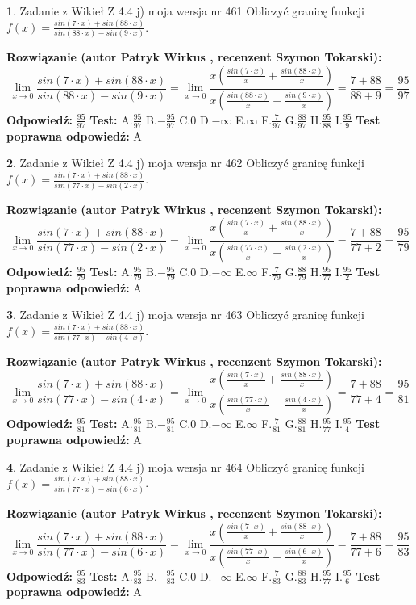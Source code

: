 \documentclass[12pt, a4paper]{article}
\theoremstyle{definition} %
\newtheorem{zad}{}
\newcommand{\zadStart}[1]{\begin{zad}#1\newline}
\newcommand{\zadStop}{\end{zad}}
\newcommand{\rozwStart}[2]{\noindent \textbf{Rozwiązanie (autor #1 , recenzent #2): }\newline}
\newcommand{\rozwStop}{\newline}
\newcommand{\odpStart}{\noindent \textbf{Odpowiedź:}\newline}
\newcommand{\odpStop}{\newline}
\newcommand{\testStart}{\noindent \textbf{Test:}\newline}
\newcommand{\testStop}{\newline}
\newcommand{\kluczStart}{\noindent \textbf{Test poprawna odpowiedź:}\newline}
\newcommand{\kluczStop}{\newline}
\begin{document}
\zadStart{Zadanie z Wikieł Z 4.4 j) moja wersja nr 461}
Obliczyć granicę funkcji $f(x)=\frac{sin(7\cdot x) +sin(88\cdot x)}{sin(88\cdot x) -sin(9\cdot x)}$.
\zadStop
\rozwStart{Patryk Wirkus}{Szymon Tokarski}
$$\lim\limits_{x\to 0}\frac{sin(7\cdot x) +sin(88\cdot x)}{sin(88\cdot x) -sin(9\cdot x)}=\lim\limits_{x\to 0}\frac{x(\frac{sin(7\cdot x)}{x}+\frac{sin(88\cdot x)}{x})}{x(\frac{sin(88\cdot x)}{x}-\frac{sin(9\cdot x)}{x})}=\frac{7+88}{88+9} = \frac{95}{97}$$
\rozwStop
\odpStart
$\frac{95}{97}$
\odpStop
\testStart
A.$\frac{95}{97}$
B.$-\frac{95}{97}$
C.$0$
D.$-\infty$
E.$\infty$
F.$\frac{7}{97}$
G.$\frac{88}{97}$
H.$\frac{95}{88}$
I.$\frac{95}{9}$
\testStop
\kluczStart
A
\kluczStop



\zadStart{Zadanie z Wikieł Z 4.4 j) moja wersja nr 462}
Obliczyć granicę funkcji $f(x)=\frac{sin(7\cdot x) +sin(88\cdot x)}{sin(77\cdot x) -sin(2\cdot x)}$.
\zadStop
\rozwStart{Patryk Wirkus}{Szymon Tokarski}
$$\lim\limits_{x\to 0}\frac{sin(7\cdot x) +sin(88\cdot x)}{sin(77\cdot x) -sin(2\cdot x)}=\lim\limits_{x\to 0}\frac{x(\frac{sin(7\cdot x)}{x}+\frac{sin(88\cdot x)}{x})}{x(\frac{sin(77\cdot x)}{x}-\frac{sin(2\cdot x)}{x})}=\frac{7+88}{77+2} = \frac{95}{79}$$
\rozwStop
\odpStart
$\frac{95}{79}$
\odpStop
\testStart
A.$\frac{95}{79}$
B.$-\frac{95}{79}$
C.$0$
D.$-\infty$
E.$\infty$
F.$\frac{7}{79}$
G.$\frac{88}{79}$
H.$\frac{95}{77}$
I.$\frac{95}{2}$
\testStop
\kluczStart
A
\kluczStop



\zadStart{Zadanie z Wikieł Z 4.4 j) moja wersja nr 463}
Obliczyć granicę funkcji $f(x)=\frac{sin(7\cdot x) +sin(88\cdot x)}{sin(77\cdot x) -sin(4\cdot x)}$.
\zadStop
\rozwStart{Patryk Wirkus}{Szymon Tokarski}
$$\lim\limits_{x\to 0}\frac{sin(7\cdot x) +sin(88\cdot x)}{sin(77\cdot x) -sin(4\cdot x)}=\lim\limits_{x\to 0}\frac{x(\frac{sin(7\cdot x)}{x}+\frac{sin(88\cdot x)}{x})}{x(\frac{sin(77\cdot x)}{x}-\frac{sin(4\cdot x)}{x})}=\frac{7+88}{77+4} = \frac{95}{81}$$
\rozwStop
\odpStart
$\frac{95}{81}$
\odpStop
\testStart
A.$\frac{95}{81}$
B.$-\frac{95}{81}$
C.$0$
D.$-\infty$
E.$\infty$
F.$\frac{7}{81}$
G.$\frac{88}{81}$
H.$\frac{95}{77}$
I.$\frac{95}{4}$
\testStop
\kluczStart
A
\kluczStop



\zadStart{Zadanie z Wikieł Z 4.4 j) moja wersja nr 464}
Obliczyć granicę funkcji $f(x)=\frac{sin(7\cdot x) +sin(88\cdot x)}{sin(77\cdot x) -sin(6\cdot x)}$.
\zadStop
\rozwStart{Patryk Wirkus}{Szymon Tokarski}
$$\lim\limits_{x\to 0}\frac{sin(7\cdot x) +sin(88\cdot x)}{sin(77\cdot x) -sin(6\cdot x)}=\lim\limits_{x\to 0}\frac{x(\frac{sin(7\cdot x)}{x}+\frac{sin(88\cdot x)}{x})}{x(\frac{sin(77\cdot x)}{x}-\frac{sin(6\cdot x)}{x})}=\frac{7+88}{77+6} = \frac{95}{83}$$
\rozwStop
\odpStart
$\frac{95}{83}$
\odpStop
\testStart
A.$\frac{95}{83}$
B.$-\frac{95}{83}$
C.$0$
D.$-\infty$
E.$\infty$
F.$\frac{7}{83}$
G.$\frac{88}{83}$
H.$\frac{95}{77}$
I.$\frac{95}{6}$
\testStop
\kluczStart
A
\kluczStop
\end{document}
